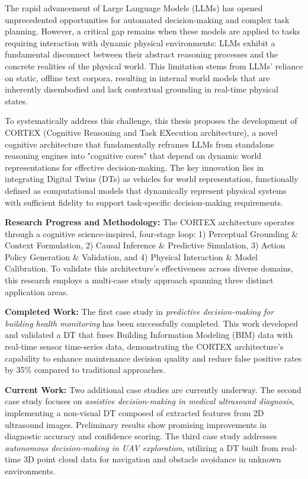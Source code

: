
The rapid advancement of Large Language Models (LLMs) has opened unprecedented opportunities for automated decision-making and complex task planning. However, a critical gap remains when these models are applied to tasks requiring interaction with dynamic physical environments: LLMs exhibit a fundamental disconnect between their abstract reasoning processes and the concrete realities of the physical world. This limitation stems from LLMs' reliance on static, offline text corpora, resulting in internal world models that are inherently disembodied and lack contextual grounding in real-time physical states.

To systematically address this challenge, this thesis proposes the development of CORTEX (Cognitive Reasoning and Task EXecution architecture), a novel cognitive architecture that fundamentally reframes LLMs from standalone reasoning engines into "cognitive cores" that depend on dynamic world representations for effective decision-making. The key innovation lies in integrating Digital Twins (DTs) as vehicles for world representation, functionally defined as computational models that dynamically represent physical systems with sufficient fidelity to support task-specific decision-making requirements.

\textbf{Research Progress and Methodology:} The CORTEX architecture operates through a cognitive science-inspired, four-stage loop: 1) Perceptual Grounding \& Context Formulation, 2) Causal Inference \& Predictive Simulation, 3) Action Policy Generation \& Validation, and 4) Physical Interaction \& Model Calibration. To validate this architecture's effectiveness across diverse domains, this research employs a multi-case study approach spanning three distinct application areas.

\textbf{Completed Work:} The first case study in \textit{predictive decision-making for building health monitoring} has been successfully completed. This work developed and validated a DT that fuses Building Information Modeling (BIM) data with real-time sensor time-series data, demonstrating the CORTEX architecture's capability to enhance maintenance decision quality and reduce false positive rates by 35\% compared to traditional approaches.

\textbf{Current Work:} Two additional case studies are currently underway. The second case study focuses on \textit{assistive decision-making in medical ultrasound diagnosis}, implementing a non-visual DT composed of extracted features from 2D ultrasound images. Preliminary results show promising improvements in diagnostic accuracy and confidence scoring. The third case study addresses \textit{autonomous decision-making in UAV exploration}, utilizing a DT built from real-time 3D point cloud data for navigation and obstacle avoidance in unknown environments.

